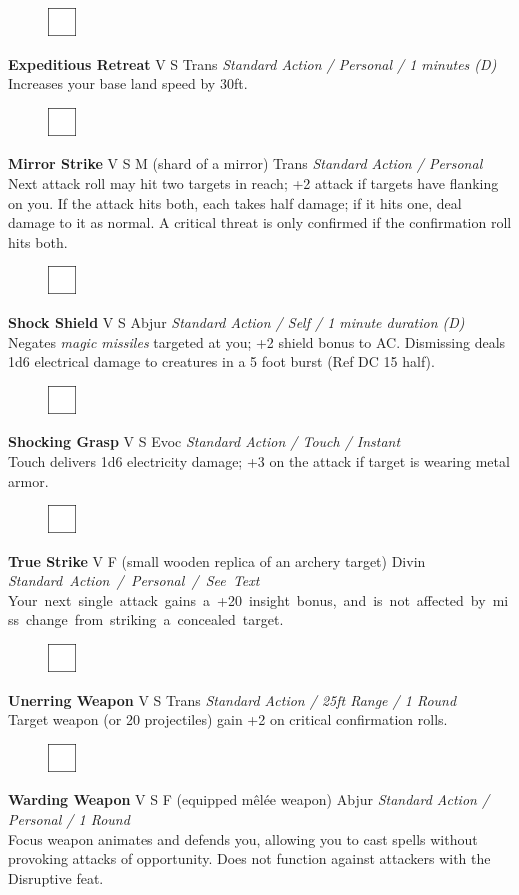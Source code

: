 \documentclass[letterpaper]{article}
\newcommand{\e}[1]{\emph{#1}}
\newcommand{\B}[1]{\textbf{#1}}
\newcommand{\spell}[7]{
\begin{figure}
\vspace{-13pt}
\ifstrequal{#2}{Full}{  \includegraphics[width=2em]{Checkbox-Full}}{
\ifstrequal{#2}{Scroll}{\includegraphics[width=2em]{Checkbox-S}}{
                        \includegraphics[width=2em]{Checkbox}}}
\ifstrequal{#7}{}{\vspace{-1em}}{\vspace{#7}}
\end{figure}
 \B{#1} #3 {
    \ifstrequal{#4}{Conj}{\color{Plum}Conj}{%
    \ifstrequal{#4}{Divin}{\color{YellowOrange}Divin}{%
    \ifstrequal{#4}{Ench}{\color{VioletRed}Ench}{%
    \ifstrequal{#4}{Trans}{\color{LimeGreen}Trans}{%
    \ifstrequal{#4}{Evoc}{\color{RedOrange}Evoc}{%
    \ifstrequal{#4}{Illu}{\color{ProcessBlue}Illu}{%
    \ifstrequal{#4}{Abjur}{\color{CadetBlue}Abjur}{%
    \ifstrequal{#4}{Necro}{\color{Red}Necro}{%
}}}}}}}}}
{\footnotesize \e{#5}} \\
#6
}
\newenvironment{notesection}[1]
{ {\huge \B{#1}}\hrule\vspace{0.5em}\begingroup\fontsize{9pt}{12pt}\selectfont}
{\endgroup}
\newcommand{\person}[3]{\B{#1
    \ifstrequal{#2}{M}{{\color{ProcessBlue}\male}}{%
    \ifstrequal{#2}{F}{\color{VioletRed}\female}{}}}{\scriptsize #3}}
\begin{document}

\spell{Expeditious Retreat}{}{V S}{Trans}{Standard Action / Personal / 1 minutes (D)}{%
Increases your base land speed by 30ft.}{}\\[-1em] %

\spell{Mirror Strike}{}{V S M (shard of a mirror)}{Trans}{Standard Action / Personal}{%
Next attack roll may hit two targets in reach; +2 attack if targets have flanking on you. If the attack hits both, each takes half damage; if it hits one, deal damage to it as normal. A critical threat is only confirmed if the confirmation roll hits both.}{}\\[-1em]

\spell{Shock Shield}{}{V S}{Abjur}{Standard Action / Self / 1 minute duration (D)}{%
Negates \emph{magic missiles} targeted at you; +2 shield bonus to AC. Dismissing deals 1d6 electrical damage to creatures in a 5 foot burst (Ref DC 15 half).}{}\\[-1em] %

\spell{Shocking Grasp}{}{V S}{Evoc}{Standard Action / Touch / Instant}{%
Touch delivers 1d6 electricity damage; +3 on the attack if target is wearing metal armor.}{}\\[-1em] %

\spell{True Strike}{}{V F (small wooden replica of an archery target)}{Divin}{\mbox{Standard Action / Personal / See Text}}{%
\mbox{Your next single attack gains a +20 insight bonus, and is not affected by miss change from striking a concealed target.}}{}\\[-1em]

\spell{Unerring Weapon}{}{V S}{Trans}{Standard Action / 25ft Range / 1 Round}{%
Target weapon (or 20 projectiles) gain +2 on critical confirmation rolls.}{}\\[-1em] %

\spell{Warding Weapon}{}{V S F (equipped m\^{e}l\'{e}e weapon)}{Abjur}{Standard Action / Personal / 1 Round}{%
Focus weapon animates and defends you, allowing you to cast spells without provoking attacks of opportunity. Does not function against attackers with the Disruptive feat.}{}\\

\twocolumn
\end{document}
